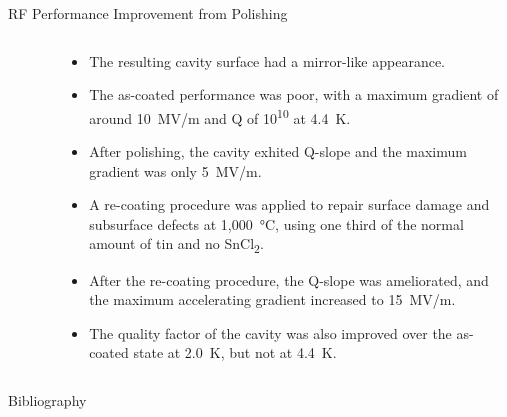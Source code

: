 \documentclass{beamer}
\begin{document}
\begin{frame}{}
\begin{columns}[t]
\begin{column}{0.32\textwidth}
\begin{block}{\label{sec:cavitycbp}RF Performance Improvement from Polishing}
\begin{columns}
\begin{column}{0.5\columnwidth}
\begin{figure}[t]
                            \end{figure}
                        \end{column}
                        \begin{column}{0.45\columnwidth}
                            \begin{itemize}
                                \item The resulting cavity surface had a mirror-like appearance.
                                \item The as-coated performance was poor, with a maximum gradient of around 10~MV/m and Q of 10\textsuperscript{10} at 4.4~K.
                                \item After polishing, the cavity exhited Q-slope and the maximum gradient was only 5~MV/m.
                                \item A re-coating procedure was applied to repair surface damage and subsurface defects at 1,000~°C, using one third of the normal amount of tin and no SnCl\textsubscript{2}.
                                \item After the re-coating procedure, the Q-slope was ameliorated, and the maximum accelerating gradient increased to 15~MV/m.
                                \item The quality factor of the cavity was also improved over the as-coated state at 2.0~K, but not at 4.4~K.
                            \end{itemize}
                        \end{column}
                    \end{columns}    
                \end{block}
                \begin{block}{\label{sec:bibliography}Bibliography}
                    \small
                    
                    
                \end{block}
            \end{column}
        \end{columns}
    \end{frame}
\end{document}
